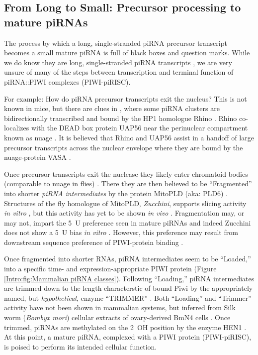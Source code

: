 {  \subsection{From Long to Small: Precursor processing to mature piRNAs}
    \label{Intro:subsec:Processing of piRNAs in mice}

    The process by which a long, single-stranded piRNA precursor transcript becomes a small mature piRNA is full of black boxes and question marks. While we do know they are long, single-stranded piRNA transcripts \citep{Brennecke2007,Li2013e}, we are very unsure of many of the steps between transcription and terminal function of piRNA::PIWI complexes (PIWI-piRISC).

    For example: How do piRNA precursor transcripts exit the nucleus? This is not known in mice, but there are clues in \flies{}, where some piRNA clusters are bidirectionally transcribed and bound by the HP1 homologue Rhino \citep{Klattenhoff2009}. Rhino co-localizes with the DEAD box protein UAP56 near the perinuclear compartment known as nuage \citep{Zhang2012}. It is believed that Rhino and UAP56 assist in a handoff of large precursor transcripts across the nuclear envelope where they are bound by the nuage-protein VASA \citep{Zhang2012}.

    Once precursor transcripts exit the nuclease they likely enter chromatoid bodies (comparable to nuage in flies) \citep{Lim2007,Meikar2011,Zhang2012}. There they are then believed to be ``Fragmented'' into shorter \textit{piRNA intermediates} \citep{Saito2010,Li2013} by the protein MitoPLD (aka: PLD6) \citep{Watanabe2011a}. Structures of the fly homologue of MitoPLD, \textit{Zucchini}, supports slicing activity \textit{in vitro} \citep{Nishimasu2012,Ipsaro2012}, but this activity has yet to be shown \textit{in vivo} \citep{Luteijn2013}. Fragmentation may, or may not, impart the 5\textprime~U preference seen in mature piRNAs \citep{Gunawardane2007,Brennecke2007} and indeed Zucchini does not show a 5\textprime~U bias \textit{in vitro} \citep{Nishimasu2012,Ipsaro2012}. However, this preference may result from downstream sequence preference of PIWI-protein binding \citep{Cora2014}.

    Once fragmented into shorter RNAs, piRNA intermediates seem to be ``Loaded,'' into a specific time- and expression-appropriate PIWI protein (Figure \ref{Intro:fig:Mammalian piRNA classes}). Following ``Loading,'' piRNA intermediates are trimmed down to the length characterstic of bound Piwi by the appropriately named, but \textit{hypothetical}, enzyme ``TRIMMER'' \citep{Li2013}. Both ``Loading'' and ``Trimmer'' activity have not been shown in mammalian systems, but inferred from Silk worm (\textit{Bombyx mori}) cellular extracts of ovary-derived BmN4 cells \citep{Kawaoka2009}. Once trimmed, piRNAs are methylated on the 2\textprime~OH position by the enzyme HEN1 \citep{Horwich2007,Kirino2007,Kawaoka2011}. At this point, a mature piRNA, complexed with a PIWI protein (PIWI-piRISC), is poised to perform its intended cellular function.

}
